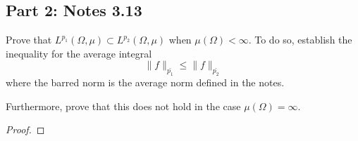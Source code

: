 \documentclass[fontsize=11pt]{scrartcl} %
\numberwithin{equation}{section} %
\numberwithin{figure}{section} %
\numberwithin{table}{section} %
\begin{document}
\subsection*{Part 2: Notes 3.13}
Prove that $L^{p_1}(\Omega,\mu)\subset L^{p_2}(\Omega,\mu)$ when
$\mu(\Omega)<\infty$. To do so, establish the inequality for the average
integral
\[
    \|f\|_{\bar{p_1}} \leq \|f\|_{\bar{p_2}}
\]
where the barred norm is the average norm defined in the notes.

Furthermore, prove that this does not hold in the case $\mu(\Omega)=\infty$.
\\
\begin{proof}

\end{proof}
\end{document}
